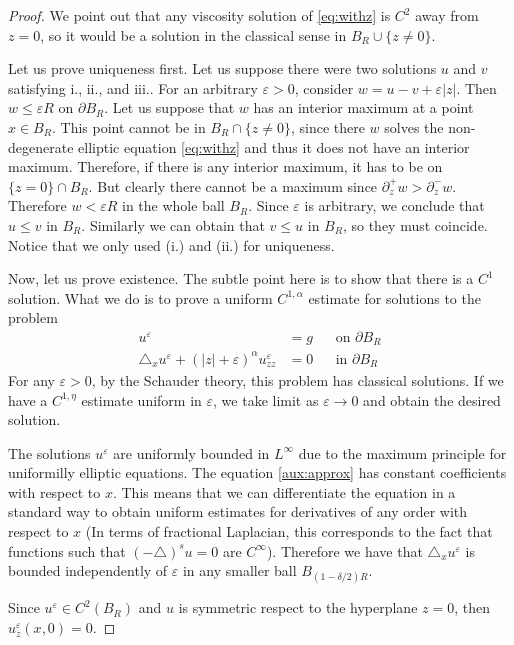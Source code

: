 \documentclass[letterpaper]{article}
\numberwithin{equation}{section}
\newcommand{\abs}[1]{\left\vert#1\right\vert}
\newcommand{\eps}{\varepsilon}
\newcommand{\lap} {\triangle}
\newcommand{\bdary} {\partial}
\newcommand{\partz}[1] {#1_z}
\newcommand{\partzz}[1] {#1_{zz}}
\begin{document}
\begin{proof}
We point out that any viscosity solution of \eqref{eq:withz} is $C^2$ away from $z=0$, so it would be a solution in the classical sense in $B_R \cup \{ z \neq 0 \}$.

Let us prove uniqueness first. Let us suppose there were two solutions $u$ and $v$ satisfying i., ii., and iii.. For an arbitrary $\eps>0$, consider $w = u - v + \eps \abs{z}$. Then $w \leq \eps R$ on $\bdary B_R$. Let us suppose that $w$ has an interior maximum at a point $x \in B_R$. This point cannot be in $B_R \cap \{z \neq 0\}$, since there $w$ solves the non-degenerate elliptic equation \eqref{eq:withz} and thus it does not have an interior maximum. Therefore, if there is any interior maximum, it has to be on $\{z = 0\} \cap B_R$. But clearly there cannot be a maximum since $\partial_z^+ w > \partial_z^- w$. Therefore $w < \eps R$ in the whole ball $B_R$. Since $\eps$ is arbitrary, we conclude that $u \leq v$ in $B_R$. Similarly we can obtain that $v \leq u$ in $B_R$, so they must coincide. Notice that we only used (i.) and (ii.) for uniqueness.

Now, let us prove existence. The subtle point here is to show that there is a $C^1$ solution. What we do is to prove a uniform $C^{1,\alpha}$ estimate for solutions to the problem
\begin{align}
u^\eps &= g && \text{on } \bdary B_R \\
\lap_x u^\eps + (\abs{z}+\eps)^\alpha \partzz u^\eps &= 0 && \text{in } \bdary B_R \label{aux:approx}
\end{align}
For any $\eps>0$, by the Schauder theory, this problem has classical solutions. If we have a $C^{1,\eta}$ estimate uniform in $\eps$, we take limit as $\eps \to 0$ and obtain the desired solution.

The solutions $u^\eps$ are uniformly bounded in $L^\infty$ due to the maximum principle for uniformilly elliptic equations. The equation \eqref{aux:approx} has constant coefficients with respect to $x$. This means that we can differentiate the equation in a standard way to obtain uniform estimates for derivatives of any order with respect to $x$ (In terms of fractional Laplacian, this corresponds to the fact that functions such that $(-\lap)^s u =0$ are $C^\infty$). Therefore we have that $\lap_x u^\eps$ is bounded independently of $\eps$ in any smaller ball $B_{(1-\delta/2)R}$.

Since $u^\eps \in C^2(B_R)$ and $u$ is symmetric respect to the hyperplane $z=0$, then $\partz u^\eps(x,0) = 0$.


\end{proof}
\end{document}
